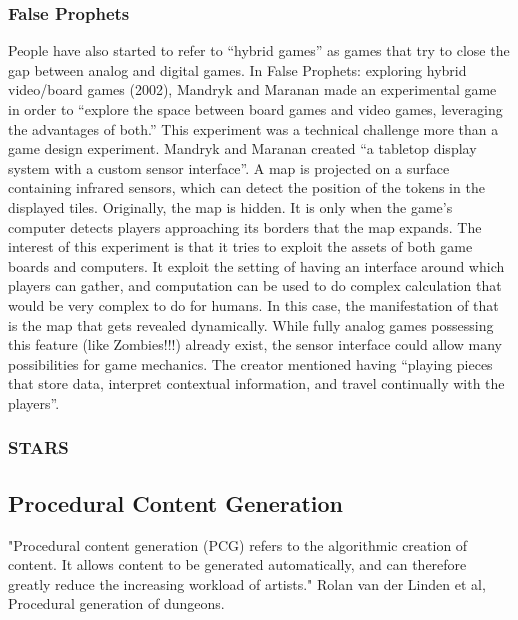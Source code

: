 \subsubsection{False Prophets}
People have also started to refer to “hybrid games” as games that try to close the gap between analog and digital games. In False Prophets: exploring hybrid video/board games (2002), Mandryk and Maranan made an experimental game in order to “explore the space between board games and video games, leveraging the advantages of both.” This experiment was a technical challenge more than a game design experiment. Mandryk and Maranan created “a tabletop display system with a custom sensor interface”. A map is projected on a surface containing infrared sensors, which can detect the position of the tokens in the displayed tiles. Originally, the map is hidden. It is only when the game’s computer detects players approaching its borders that the map expands. The interest of this experiment is that it tries to exploit the assets of both game boards and computers. It exploit the setting of having an interface around which players can gather, and computation can be used to do complex calculation that would be very complex to do for humans. In this case, the manifestation of that is the map that gets revealed dynamically. While fully analog games possessing this feature (like Zombies!!!) already exist, the sensor interface could allow many possibilities for game mechanics. The creator mentioned having “playing pieces that store data, interpret contextual information, and travel continually with the players”.
\subsubsection{STARS}
\subsection{Procedural Content Generation}
"Procedural content generation (PCG) refers to the algorithmic creation of content. It allows content to be generated automatically, and can therefore greatly reduce the increasing workload of artists." Rolan van der Linden et al, Procedural generation of dungeons.
